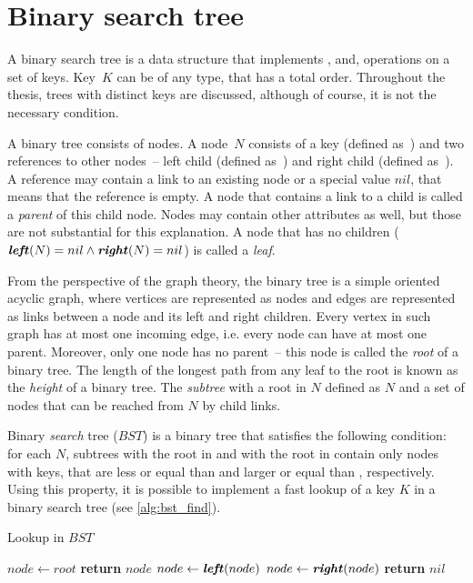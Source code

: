 
\section{Binary search tree}

A binary search tree is a data structure that implements \findop, \insertop and, \removeop operations on a set of keys. Key~$K$ can be of any type, that has a total order. Throughout the thesis, trees with distinct keys are discussed, although of course, it is not the necessary condition.

A binary tree consists of nodes. A node~$N$ consists of a key (defined as~) and two references to other nodes~-- left child (defined as~) and right child (defined as~). A reference may contain a link to an existing node or a special value $nil$, that means that the reference is empty. A node that contains a link to a child is called a \emph{parent} of this child node. Nodes may contain other attributes as well, but those are not substantial for this explanation. A node that has no children (\(\textbf{\textit{left}}(N) = nil \land \textbf{\textit{right}}(N) = nil\)) is called a \emph{leaf}.

From the perspective of the graph theory, the binary tree is a simple oriented acyclic graph, where vertices are represented as nodes and edges are represented as links between a node and its left and right children. Every vertex in such graph has at most one incoming edge, i.e. every node can have at most one parent. Moreover, only one node has no parent~-- this node is called the \emph{root} of a binary tree. The length of the longest path from any leaf to the root is known as the \emph{height} of a binary tree. The \emph{subtree} with a root in $N$ defined as $N$ and a set of nodes that can be reached from $N$ by child links.

Binary \emph{search} tree ($BST$) is a binary tree that satisfies the following condition: for each $N$, subtrees with the root in  and with the root in  contain only nodes with keys, that are less or equal than  and larger or equal than , respectively. Using this property, it is possible to implement a fast lookup of a key $K$ in a binary search tree (see \cref{alg:bst_find}).

\begin{algorithm}
\caption{Lookup in $BST$}\label{alg:bst_find}
\begin{algorithmic}[1]
    \State $node\gets root$
      \State \textbf{return} $node$
      \State $node \gets \textbf{\textit{left}}(node)$
    \Else {}
      \State $node \gets \textbf{\textit{right}}(node)$
    \EndIf
    \EndWhile
    \State \textbf{return} $nil$
  \EndProcedure
\end{algorithmic}
\end{algorithm}

